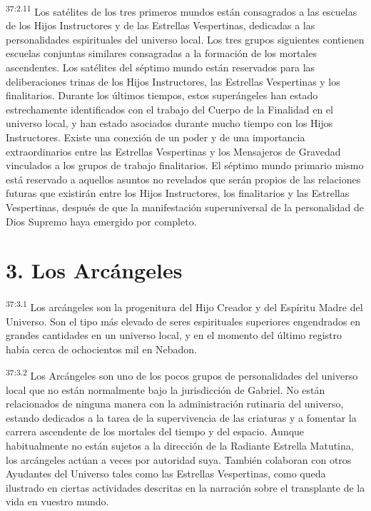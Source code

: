 \par
\textsuperscript{37:2.11} Los satélites de los tres primeros mundos están consagrados a las escuelas de los Hijos Instructores y de las Estrellas Vespertinas, dedicadas a las personalidades espirituales del universo local. Los tres grupos siguientes contienen escuelas conjuntas similares consagradas a la formación de los mortales ascendentes. Los satélites del séptimo mundo están reservados para las deliberaciones trinas de los Hijos Instructores, las Estrellas Vespertinas y los finalitarios. Durante los últimos tiempos, estos superángeles han estado estrechamente identificados con el trabajo del Cuerpo de la Finalidad en el universo local, y han estado asociados durante mucho tiempo con los Hijos Instructores. Existe una conexión de un poder y de una importancia extraordinarios entre las Estrellas Vespertinas y los Mensajeros de Gravedad vinculados a los grupos de trabajo finalitarios. El séptimo mundo primario mismo está reservado a aquellos asuntos no revelados que serán propios de las relaciones futuras que existirán entre los Hijos Instructores, los finalitarios y las Estrellas Vespertinas, después de que la manifestación superuniversal de la personalidad de Dios Supremo haya emergido por completo.

\section*{3. Los Arcángeles}
\par
\textsuperscript{37:3.1} Los arcángeles son la progenitura del Hijo Creador y del Espíritu Madre del Universo. Son el tipo más elevado de seres espirituales superiores engendrados en grandes cantidades en un universo local, y en el momento del último registro había cerca de ochocientos mil en Nebadon.

\par
\textsuperscript{37:3.2} Los Arcángeles son uno de los pocos grupos de personalidades del universo local que no están normalmente bajo la jurisdicción de Gabriel. No están relacionados de ninguna manera con la administración rutinaria del universo, estando dedicados a la tarea de la supervivencia de las criaturas y a fomentar la carrera ascendente de los mortales del tiempo y del espacio. Aunque habitualmente no están sujetos a la dirección de la Radiante Estrella Matutina, los arcángeles actúan a veces por autoridad suya. También colaboran con otros Ayudantes del Universo tales como las Estrellas Vespertinas, como queda ilustrado en ciertas actividades descritas en la narración sobre el transplante de la vida en vuestro mundo.

